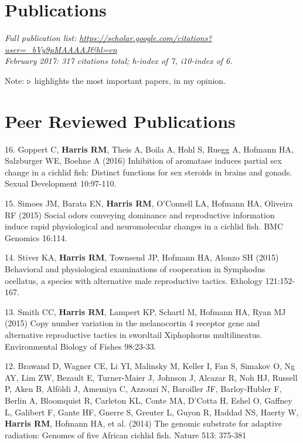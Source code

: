 \documentclass[margin,line]{resume}
\begin{document}
\begin{resume}
    \section{\mysidestyle Publications}

{\em Full publication list: \url{https://scholar.google.com/citations?user=_bVy9pMAAAAJ&hl=en}
\\
  February 2017: 317 citations total; h-index of 7, i10-index of 6.}
  
Note: {\color{red} ${\bf \triangleright}$} highlights the most important
papers, in my opinion.

    \section{\mysidestyle Peer Reviewed Publications}

16. Goppert C, {\bf Harris RM}, Theis A, Boila A, Hohl S, Ruegg A, Hofmann HA, Salzburger WE, Boehne A (2016)  Inhibition of aromatase induces partial sex change in a cichlid fish: Distinct functions for sex steroids in brains and gonads. Sexual Development 10:97-110.

15. Simoes JM, Barata EN, {\bf Harris RM}, O'Connell LA, Hofmann HA, Oliveira RF (2015) Social odors conveying dominance and reproductive information induce rapid physiological and neuromolecular changes in a cichlid fish. BMC Genomics 16:114. 

14. Stiver KA, {\bf Harris RM}, Townsend JP, Hofmann HA, Alonzo SH (2015) Behavioral and physiological examinations of cooperation in Symphodus ocellatus, a species with alternative male reproductive tactics. Ethology 121:152-167.

13. Smith CC, {\bf Harris RM}, Lampert KP, Schartl M, Hofmann HA, Ryan MJ (2015) Copy number variation in the melanocortin 4 receptor gene and alternative reproductive tactics in swordtail Xiphophorus multilineatus. Environmental Biology of Fishes 98:23-33.

12. Brawand D, Wagner CE, Li YI, Malinsky M, Keller I, Fan S, Simakov O, Ng AY, Lim ZW, Bezault E, Turner-Maier J, Johnson J, Alcazar R, Noh HJ, Russell P, Aken B, Alföldi J, Amemiya C, Azzouzi N, Baroiller JF, Barloy-Hubler F, Berlin A, Bloomquist R, Carleton KL, Conte MA, D'Cotta H, Eshel O, Gaffney L, Galibert F, Gante HF, Gnerre S, Greuter L, Guyon R, Haddad NS, Haerty W, {\bf Harris RM}, Hofmann HA, et al. (2014) The genomic substrate for adaptive radiation: Genomes of five African cichlid fish. Nature 513: 375-381


\end{resume}
\end{document}
